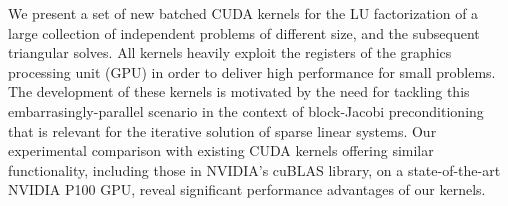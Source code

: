 We present a set of new batched CUDA kernels for the LU factorization of 
a large collection of independent problems of different size, and the subsequent triangular solves.
All kernels heavily exploit the registers of the graphics processing unit (GPU) in order to deliver high
performance for small problems. The development of these kernels
is motivated by the need for tackling this embarrasingly-parallel scenario in the context of 
block-Jacobi preconditioning 
that is relevant for the iterative solution of sparse linear systems.
Our experimental comparison 
with existing CUDA kernels offering similar functionality, 
including those in NVIDIA's cuBLAS library,
on a state-of-the-art NVIDIA P100 GPU,
reveal significant performance advantages of our kernels.
